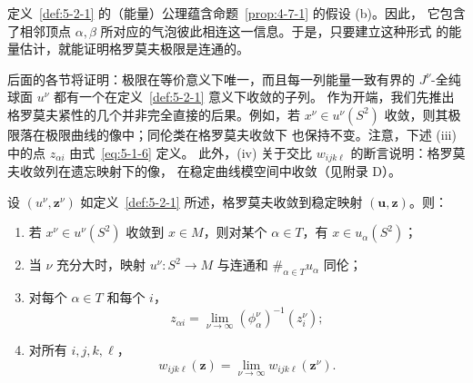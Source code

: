 定义~\ref{def:5-2-1} 的（能量）公理蕴含命题~\ref{prop:4-7-1} 的假设 (b)。因此，
它包含了相邻顶点 $\alpha,\beta$ 所对应的气泡彼此相连这一信息。于是，只要建立这种形式
的能量估计，就能证明格罗莫夫极限是连通的。

后面的各节将证明：极限在等价意义下唯一，而且每一列能量一致有界的
$J^\nu$-全纯球面 $u^\nu$ 都有一个在定义~\ref{def:5-2-1} 意义下收敛的子列。
作为开端，我们先推出格罗莫夫紧性的几个并非完全直接的后果。例如，若
$x^\nu\in u^\nu(S^2)$ 收敛，则其极限落在极限曲线的像中；同伦类在格罗莫夫收敛下
也保持不变。注意，下述 (iii) 中的点 $z_{\alpha i}$ 由式~\eqref{eq:5-1-6} 定义。
此外，(iv) 关于交比 $w_{ijk\ell}$ 的断言说明：格罗莫夫收敛列在遗忘映射下的像，
在稳定曲线模空间中收敛（见附录 D）。

\begin{theorem}\label{thm:5-2-2}
设 $(u^\nu,\mathbf z^\nu)$ 如定义~\ref{def:5-2-1} 所述，格罗莫夫收敛到稳定映射
$(\mathbf u,\mathbf z)$。则：
\begin{enumerate}[label=(\roman*),leftmargin=3em]
\item 若 $x^\nu\in u^\nu(S^2)$ 收敛到 $x\in M$，则对某个 $\alpha\in T$，有
$x\in u_\alpha(S^2)$；
\item 当 $\nu$ 充分大时，映射 $u^\nu:S^2\to M$ 与连通和
$\#_{\alpha\in T}u_\alpha$ 同伦；
\item 对每个 $\alpha\in T$ 和每个 $i$，
\[
  z_{\alpha i}=\lim_{\nu\to\infty}
  (\phi_\alpha^\nu)^{-1}(z_i^\nu);
\]
\item 对所有 $i,j,k,\ell$，
\[
  w_{ijk\ell}(\mathbf z)
  =\lim_{\nu\to\infty}w_{ijk\ell}(\mathbf z^\nu).
\]
\end{enumerate}
\end{theorem}

